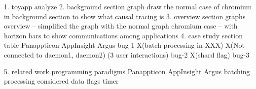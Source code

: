 1. toyapp analyze
2. background section graph
    draw the normal case of chromium in background section to show what causal tracing is
3. overview section graphs
    overview -- simplified the graph with the normal graph
    chromium case -- with horizon bars to show communications among applications
4. case study section table
            Panappticon                         AppInsight                                  Argus
    bug-1   X(batch processing in XXX)         X(Not connected to daemon1, daemon2)         (3 user interactions)
    bug-2   X(shard flag)
    bug-3 

5. related work
    programming paradigms   Panappticon          AppInsight                 Argus 
    batching processing                                                  considered
    data flags
    timer
